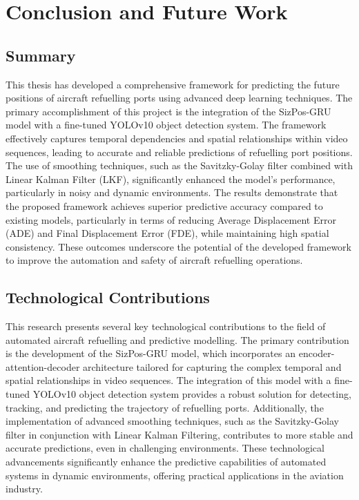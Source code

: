 \documentclass[12pt,oneside]{book} %
\begin{document}
\chapter{Conclusion and Future Work}

\section{Summary}
This thesis has developed a comprehensive framework for predicting the future
positions of aircraft refuelling ports using advanced deep learning techniques.
The primary accomplishment of this project is the integration of the SizPos-GRU
model with a fine-tuned YOLOv10 object detection system. The framework
effectively captures temporal dependencies and spatial relationships within
video sequences, leading to accurate and reliable predictions of refuelling
port positions. The use of smoothing techniques, such as the Savitzky-Golay
filter combined with Linear Kalman Filter (LKF), significantly enhanced the
model’s performance, particularly in noisy and dynamic environments. The
results demonstrate that the proposed framework achieves superior predictive
accuracy compared to existing models, particularly in terms of reducing Average
Displacement Error (ADE) and Final Displacement Error (FDE), while maintaining
high spatial consistency. These outcomes underscore the potential of the
developed framework to improve the automation and safety of aircraft refuelling
operations.

\section{Technological Contributions}
This research presents several key technological contributions to the field of
automated aircraft refuelling and predictive modelling. The primary
contribution is the development of the SizPos-GRU model, which incorporates an
encoder-attention-decoder architecture tailored for capturing the complex
temporal and spatial relationships in video sequences. The integration of this
model with a fine-tuned YOLOv10 object detection system provides a robust
solution for detecting, tracking, and predicting the trajectory of refuelling
ports. Additionally, the implementation of advanced smoothing techniques, such
as the Savitzky-Golay filter in conjunction with Linear Kalman Filtering,
contributes to more stable and accurate predictions, even in challenging
environments. These technological advancements significantly enhance the
predictive capabilities of automated systems in dynamic environments, offering
practical applications in the aviation industry.
\end{document}
